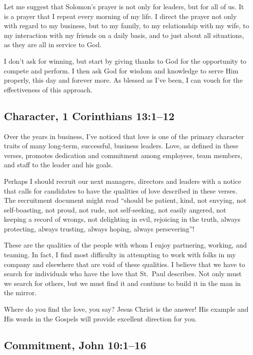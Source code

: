 \documentclass[12pt]{memoir}
\begin{document}
Let me suggest that Solomon's prayer is not only for leaders, but
for all of us. It is a prayer that I repeat every morning
of my life. I direct the prayer not only with regard to my business, but to my
family, to my relationship with my wife, to my interaction with my
friends on a daily basis, and to just about all situations, as they
are all in service to God.

I don't ask for winning, but start by giving
thanks to God for the opportunity to compete and perform. I then ask
God for wisdom and knowledge to serve Him properly, this day and forever
more. As blessed as I've been, I can vouch for the effectiveness of
this approach.

\subsection[Character]{Character, 1 Corinthians 13:1--12}

Over the years in business, I've noticed that love is one of the primary
character traits of many long-term, successful, business leaders.
Love, as defined in these verses, promotes dedication and commitment among employees, team members, and staff to the leader and his goals.

Perhaps I should recruit our next managers, directors and leaders with a notice that calls for candidates to have the qualities of love described in these verses. The recruitment document might read ``should be patient, kind, not envying, not self-boasting, not proud, not rude, not self-seeking, not easily angered, not keeping a record of wrongs, not delighting in evil, rejoicing in the truth, always protecting, always trusting, always hoping, always persevering''!

These are the qualities of the people with whom I enjoy partnering,
working, and teaming. In fact, I find most difficulty in attempting
to work with folks in my company and elsewhere that are void of these
qualities.
I believe that we have to search for individuals who have
the love that St.~Paul describes. Not only must we search for others,
but we must find it and continue to build it in the man in the
mirror.

Where do you find the love, you say?
Jesus Christ is the
answer! His example and His words in the Gospels will provide excellent
direction for you.

\subsection[Commitment]{Commitment, John 10:1--16}
\end{document}

